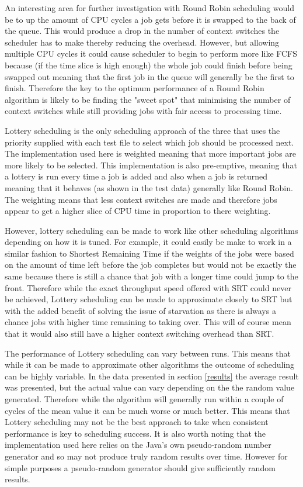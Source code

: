 \documentclass{acm_proc_article-sp}
\begin{document}
An interesting area for further investigation with Round Robin scheduling would be to up the amount of CPU cycles a job gets before it is swapped to the back of the queue. This would produce a drop in the number of context switches the scheduler has to make thereby reducing the overhead. However, but allowing multiple CPU cycles it could cause scheduler to begin to perform more like FCFS because (if the time slice is high enough) the whole job could finish before being swapped out meaning that the first job in the queue will generally be the first to finish. Therefore the key to  the optimum performance of a Round Robin algorithm is likely to be finding the "sweet spot" that minimising the number of context switches while still providing jobs with fair access to processing time.

Lottery scheduling is the only scheduling approach of the three that uses the priority supplied with each test file to select which job should be processed next. The implementation used here is weighted meaning that more important jobs are more likely to be selected. This implementation is also pre-emptive, meaning that a lottery is run every time a job is added and also when a job is returned meaning that it behaves (as shown in the test data) generally like Round Robin. The weighting means that less context switches are made and therefore jobs appear to get a higher slice of CPU time in proportion to there weighting.

However, lottery scheduling can be made to work like other scheduling algorithms depending on how it is tuned. For example, it could easily be make to work in a similar fashion to Shortest Remaining Time if the weights of the jobs were based on the amount of time left before the job completes but would not be exactly the same because there is still a chance that job with a longer time could jump to the front. Therefore while the exact throughput speed offered with SRT could never be achieved, Lottery scheduling can be made to approximate closely to SRT but with the added benefit of solving the issue of starvation as there is always a chance jobs with higher time remaining to taking over. This will of course mean that it would also still have a higher context switching overhead than SRT.

The performance of Lottery scheduling can vary between runs. This means that while it can be made to approximate other algorithms the outcome of scheduling can be highly variable. In the data presented in section \ref{results} the average result was presented, but the actual value can vary depending on the the random value generated. Therefore while the algorithm will generally run within a couple of cycles of the mean value it can be much worse or much better. This means that Lottery scheduling may not be the best approach to take when consistent performance is key to scheduling success. It is also worth noting that the implementation used here relies on the Java's own pseudo-random number generator and so may not produce truly random results over time. However for simple purposes a pseudo-random generator should give sufficiently random results.
\end{document}
